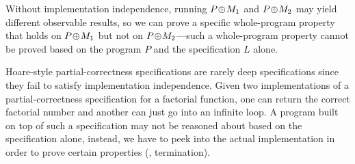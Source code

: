 Without implementation independence, running $P\!\oplus\! M_1$ and
$P\!\oplus\! M_2$ may yield different observable results, so we can prove
a specific whole-program property that holds on $P\!\oplus\! M_1$ but not on
$P\!\oplus\! M_2$---such a whole-program property cannot be proved based
on the program $P$ and the specification $L$ alone. 

Hoare-style partial-correctness specifications are rarely
deep specifications since they fail to satisfy implementation
independence. Given two implementations of a partial-correctness
specification for a factorial function, one can return the correct
factorial number and another can just go into an infinite loop.  A
program built on top of such a specification may not be reasoned about 
based on the specification alone, instead, we have to peek into the actual
implementation in order to prove certain properties (\eg,
termination).

